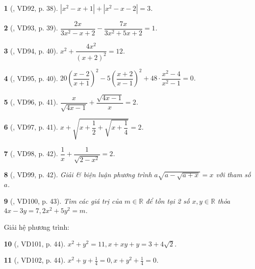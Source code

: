 \documentclass{article}
\newtheorem{baitoan}{}
\begin{document}
\begin{baitoan}[\cite{Binh_Toan_9_tap_2}, VD92, p. 38]
	$|x^2 - x + 1| + |x^2 - x - 2| = 3$.
\end{baitoan}

\begin{baitoan}[\cite{Binh_Toan_9_tap_2}, VD93, p. 39]
	$\dfrac{2x}{3x^2 - x + 2} - \dfrac{7x}{3x^2 + 5x + 2} = 1$.
\end{baitoan}

\begin{baitoan}[\cite{Binh_Toan_9_tap_2}, VD94, p. 40]
	$x^2 + \dfrac{4x^2}{(x + 2)^2} = 12$.
\end{baitoan}

\begin{baitoan}[\cite{Binh_Toan_9_tap_2}, VD95, p. 40]
	$20\left(\dfrac{x - 2}{x + 1}\right)^2 - 5\left(\dfrac{x + 2}{x - 1}\right)^2 + 48\cdot\dfrac{x^2 - 4}{x^2 - 1} = 0$.
\end{baitoan}

\begin{baitoan}[\cite{Binh_Toan_9_tap_2}, VD96, p. 41]
	$\dfrac{x}{\sqrt{4x - 1}} + \dfrac{\sqrt{4x - 1}}{x} = 2$.
\end{baitoan}

\begin{baitoan}[\cite{Binh_Toan_9_tap_2}, VD97, p. 41]
	$x + \sqrt{x + \dfrac{1}{2} + \sqrt{x + \dfrac{1}{4}}} = 2$.
\end{baitoan}

\begin{baitoan}[\cite{Binh_Toan_9_tap_2}, VD98, p. 42]
	$\dfrac{1}{x} + \dfrac{1}{\sqrt{2 - x^2}} = 2$.
\end{baitoan}

\begin{baitoan}[\cite{Binh_Toan_9_tap_2}, VD99, p. 42]
	Giải \& biện luận phương trình $a\sqrt{a - \sqrt{a + x}} = x$ với tham số $a$.
\end{baitoan}

\begin{baitoan}[\cite{Binh_Toan_9_tap_2}, VD100, p. 43]
	Tìm các giá trị của $m\in\mathbb{R}$ để tồn tại 2 số $x,y\in\mathbb{R}$ thỏa $4x - 3y = 7,2x^2 + 5y^2 = m$.
\end{baitoan}
Giải hệ phương trình:

\begin{baitoan}[\cite{Binh_Toan_9_tap_2}, VD101, p. 44]	
	$x^2 + y^2 = 11,x + xy + y = 3 + 4\sqrt{2}$.
\end{baitoan}

\begin{baitoan}[\cite{Binh_Toan_9_tap_2}, VD102, p. 44]
	$x^2 + y + \frac{1}{4} = 0,x + y^2 + \frac{1}{4} = 0$.
\end{baitoan}
\end{document}
